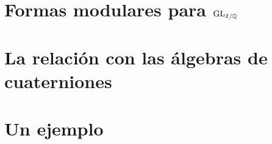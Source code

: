 

\section{Formas modulares para ${\mathrm{GL}_{2}}_{/\mathbb{Q}}$}\label{sec:introformasglq}

\section{La relaci\'{o}n con las \'{a}lgebras de cuaterniones}%
	\label{sec:introrelacionconlasalgebras}

\section{Un ejemplo}\label{sec:introunejemplo}


